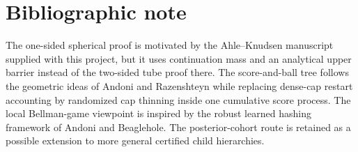 \documentclass[10pt]{article}
\theoremstyle{definition}
\begin{document}
\section{Bibliographic note}

The one-sided spherical proof is motivated by the Ahle--Knudsen manuscript supplied with this project, but it uses continuation mass and an analytical upper barrier instead of the two-sided tube proof there. The score-and-ball tree follows the geometric ideas of Andoni and Razenshteyn while replacing dense-cap restart accounting by randomized cap thinning inside one cumulative score process. The local Bellman-game viewpoint is inspired by the robust learned hashing framework of Andoni and Beaglehole. The posterior-cohort route is retained as a possible extension to more general certified child hierarchies.
\end{document}
